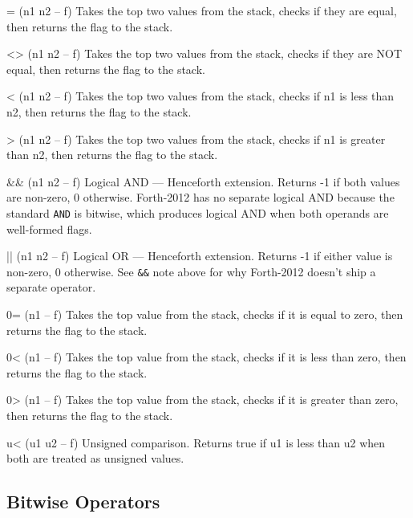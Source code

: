 \documentclass[a4paper, 11pt, openany]{book}
\begin{document}
\begin{forthbox}
  =    (n1 n2 -- f)
       Takes the top two values from the stack, checks if they
       are equal, then returns the flag to the stack.

  <>   (n1 n2 -- f)
       Takes the top two values from the stack, checks if they
       are NOT equal, then returns the flag to the stack.

  <    (n1 n2 -- f)
       Takes the top two values from the stack, checks if n1 is
       less than n2, then returns the flag to the stack.

  >    (n1 n2 -- f)
       Takes the top two values from the stack, checks if n1 is
       greater than n2, then returns the flag to the stack.

  &&   (n1 n2 -- f)
       Logical AND --- Henceforth extension. Returns -1 if both
       values are non-zero, 0 otherwise. Forth-2012 has no
       separate logical AND because the standard \texttt{AND} is
       bitwise, which produces logical AND when both operands are
       well-formed flags.

  ||   (n1 n2 -- f)
       Logical OR --- Henceforth extension. Returns -1 if either
       value is non-zero, 0 otherwise. See \texttt{\&\&} note above
       for why Forth-2012 doesn't ship a separate operator.

  0=   (n1 -- f)
       Takes the top value from the stack, checks if it is equal
       to zero, then returns the flag to the stack.

  0<   (n1 -- f)
       Takes the top value from the stack, checks if it is less
       than zero, then returns the flag to the stack.

  0>   (n1 -- f)
       Takes the top value from the stack, checks if it is
       greater than zero, then returns the flag to the stack.

  u<   (u1 u2 -- f)
       Unsigned comparison. Returns true if u1 is less than u2
       when both are treated as unsigned values.
\end{forthbox}

\subsection{Bitwise Operators}
\end{document}
